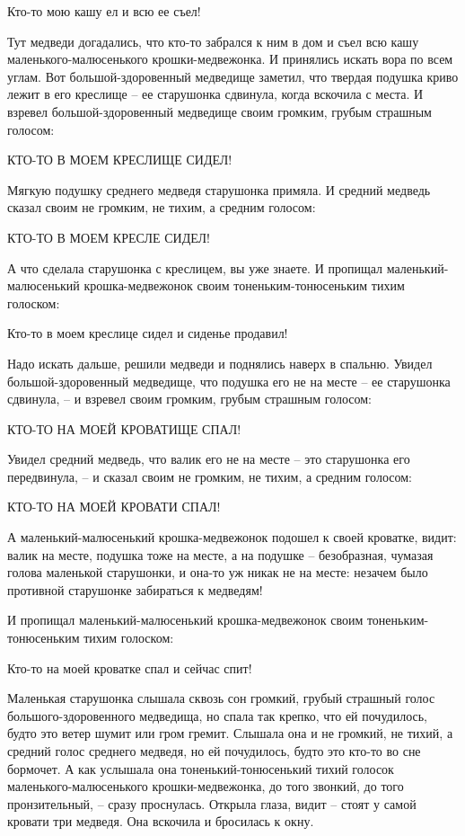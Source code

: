 Кто-то мою кашу ел и всю ее съел!

Тут медведи догадались, что кто-то забрался к ним в дом и съел всю кашу маленького-малюсенького крошки-медвежонка. И принялись искать вора по всем углам. Вот большой-здоровенный медведище заметил, что твердая подушка криво лежит в его креслище – ее старушонка сдвинула, когда вскочила с места. И взревел большой-здоровенный медведище своим громким, грубым страшным голосом:

КТО-ТО В МОЕМ КРЕСЛИЩЕ СИДЕЛ!

Мягкую подушку среднего медведя старушонка примяла. И средний медведь сказал своим не громким, не тихим, а средним голосом:

КТО-ТО В МОЕМ КРЕСЛЕ СИДЕЛ!

А что сделала старушонка с креслицем, вы уже знаете. И пропищал маленький-малюсенький крошка-медвежонок своим тоненьким-тонюсеньким тихим голоском:

Кто-то в моем креслице сидел и сиденье продавил!

Надо искать дальше, решили медведи и поднялись наверх в спальню. Увидел большой-здоровенный медведище, что подушка его не на месте – ее старушонка сдвинула, – и взревел своим громким, грубым страшным голосом:

КТО-ТО НА МОЕЙ КРОВАТИЩЕ СПАЛ!

Увидел средний медведь, что валик его не на месте – это старушонка его передвинула, – и сказал своим не громким, не тихим, а средним голосом:

КТО-ТО НА МОЕЙ КРОВАТИ СПАЛ!

А маленький-малюсенький крошка-медвежонок подошел к своей кроватке, видит: валик на месте, подушка тоже на месте, а на подушке – безобразная, чумазая голова маленькой старушонки, и она-то уж никак не на месте: незачем было противной старушонке забираться к медведям!

И пропищал маленький-малюсенький крошка-медвежонок своим тоненьким-тонюсеньким тихим голоском:

Кто-то на моей кроватке спал и сейчас спит!

Маленькая старушонка слышала сквозь сон громкий, грубый страшный голос большого-здоровенного медведища, но спала так крепко, что ей почудилось, будто это ветер шумит или гром гремит. Слышала она и не громкий, не тихий, а средний голос среднего медведя, но ей почудилось, будто это кто-то во сне бормочет. А как услышала она тоненький-тонюсенький тихий голосок маленького-малюсенького крошки-медвежонка, до того звонкий, до того пронзительный, – сразу проснулась. Открыла глаза, видит – стоят у самой кровати три медведя. Она вскочила и бросилась к окну.

